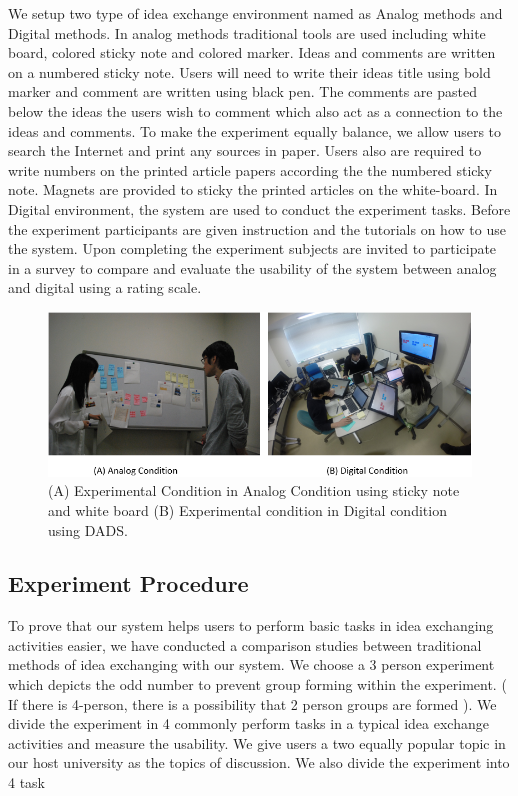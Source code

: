 \documentclass{sigchi}
\begin{document}
\begin{itemize}
\begin{itemize}
We setup two type of idea exchange environment named as Analog methods and Digital methods. In analog methods traditional tools are used including white board, colored sticky note and colored marker. Ideas and comments are written on a numbered  sticky note. Users will need to write their ideas title using bold marker and comment are written using black pen. The comments  are pasted below the ideas the users wish to comment which also act as a connection to the ideas and comments. To make the experiment equally balance, we allow users to search the Internet and print any sources in paper. Users also are required to write numbers on the printed article papers according the the numbered sticky note. Magnets are provided to sticky the printed articles on the white-board. In Digital environment, the system are used to conduct the experiment tasks. Before the experiment participants are given instruction and the tutorials on how to use the system. Upon completing the experiment subjects are invited to participate in a survey to compare and evaluate the usability of the system between analog and digital using a rating scale.

\begin{figure}[!h]
\centering
\includegraphics[width=1.0\columnwidth]{condition}
\caption{(A) Experimental Condition in Analog Condition using sticky note and white board (B) Experimental condition in Digital condition using DADS.}
\label{fig:figure1}
\end{figure}


\subsection{Experiment Procedure}

To prove that our system helps users to perform basic tasks in idea exchanging activities easier, we have conducted a comparison studies between traditional methods of idea exchanging  with our system. We choose a 3 person experiment which depicts the odd number to prevent group forming within the experiment. ( If there is 4-person, there is a possibility that 2 person groups are formed ). We divide the experiment in 4 commonly perform tasks in a typical idea exchange activities and measure the usability.  We give users a two equally popular topic in our host university as the topics of discussion. We also divide the experiment into 4 task


\end{itemize}
\end{itemize}
\end{document}
